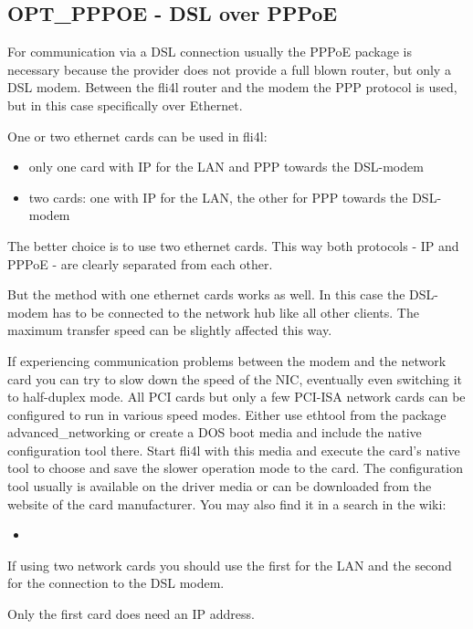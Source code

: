 {
\subsection {OPT\_PPPOE - DSL over PPPoE}
}

For communication via a DSL connection usually the PPPoE package 
is necessary because the provider does not provide a full blown router,
but only a DSL modem. Between the fli4l router and the modem the 
PPP protocol is used, but in this case specifically over Ethernet.

One or two ethernet cards can be used in fli4l:
\begin{itemize}
\item only one card with IP for the LAN and PPP towards the DSL-modem
\item two cards: one with IP for the LAN, the other for PPP towards the DSL-modem
\end{itemize}

The better choice is to use two ethernet cards. This way both protocols 
- IP and PPPoE - are clearly separated from each other.

But the method with one ethernet cards works as well. In this case 
the DSL-modem has to be connected to the network hub like all other 
clients. The maximum transfer speed can be slightly affected this way.

If experiencing communication problems between the modem and the 
network card you can try to slow down the speed of the NIC, eventually
even switching it to half-duplex mode. All PCI cards but only a few 
PCI-ISA network cards can be configured to run in various speed modes.
Either use ethtool from the package advanced\_networking or create a 
DOS boot media and include the native configuration tool there. Start 
fli4l with this media and execute the card's native tool to choose 
and save the slower operation mode to the card. The configuration 
tool usually is available on the driver media or can be downloaded 
from the website of the card manufacturer.
You may also find it in a search in the wiki:
\begin{itemize}
\item {}
\end{itemize}

If using two network cards you should use the first for the LAN and 
the second for the connection to the DSL modem.

Only the first card does need an IP address.

